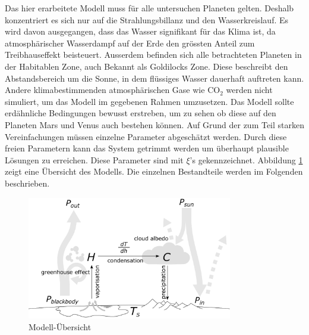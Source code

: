 \begin{refsection}
	

	
	
	
	Das hier erarbeitete Modell muss für alle untersuchen Planeten gelten. Deshalb konzentriert es sich nur auf die Strahlungsbillanz und den Wasserkreislauf. Es wird davon ausgegangen, dass das Wasser signifikant für das Klima ist, da atmosphärischer Wasserdampf auf der Erde den grössten Anteil zum Treibhauseffekt beisteuert. Ausserdem befinden sich alle betrachteten Planeten in der Habitablen Zone, auch Bekannt als Goldilocks Zone. Diese beschreibt den Abstandsbereich um die Sonne, in dem flüssiges Wasser dauerhaft auftreten kann.
	Andere klimabestimmenden atmosphärischen Gase wie $\text{CO}_\text{2}$ werden nicht simuliert, um das Modell im gegebenen Rahmen umzusetzen.
	Das Modell sollte erdähnliche Bedingungen bewusst erstreben, um zu sehen ob diese auf den Planeten Mars und Venus auch bestehen können.
Auf Grund der zum Teil starken Vereinfachungen müssen einzelne Parameter abgeschätzt werden. Durch diese freien Parametern kann das System getrimmt werden um überhaupt plausible Lösungen zu erreichen. Diese Parameter sind mit $\xi$'s gekennzeichnet.
	Abbildung \ref{planeten:model} zeigt eine Übersicht des Modells. Die einzelnen Bestandteile werden im Folgenden beschrieben.



	

	

\begin{figure}
	\centering
	\includegraphics[width=0.8\textwidth]{planeten/Pictures/Model.eps}
	\caption{Modell-Übersicht}
	\label{planeten:model}
\end{figure}


\end{refsection}
